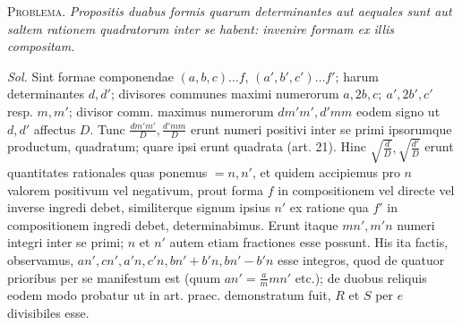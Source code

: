 \textsc{Problema.} \textit{Propositis duabus formis quarum determinantes aut aequales sunt aut saltem rationem quadratorum inter se habent: invenire formam ex illis compositam.}

\textit{Sol.} Sint formae componendae $(a,b,c)\ldots f$, $(a',b',c')\ldots f'$; harum determinantes $d,d'$; divisores communes maximi numerorum $a,2b,c;\ a',2b',c'$ resp. $m,m'$; divisor comm. maximus numerorum $dm'm',d'mm$ eodem signo ut $d,d'$
affectus $D$. Tunc $\frac{dm'm'}{D},\frac{d'mm}{D}$ erunt numeri positivi inter se primi ipsorumque productum, quadratum; quare ipsi erunt quadrata (art. 21). Hinc $\sqrt{\frac{d}{D}},\sqrt{\frac{d'}{D}}$ erunt quantitates rationales quas ponemus $=n,n'$, et quidem accipiemus pro $n$ valorem positivum vel negativum, prout forma $f$ in compositionem vel directe vel inverse ingredi debet, similiterque signum ipsius $n'$ ex ratione qua $f'$ in compositionem ingredi debet, determinabimus. Erunt itaque $mn',m'n$ numeri integri inter se primi; $n$ et $n'$ autem etiam fractiones esse possunt. His ita factis, observamus, $an',cn',a'n,c'n,bn'+b'n,bn'-b'n$ esse integros, quod de quatuor prioribus per se manifestum est (quum $an'=\frac{a}{m}mn'$ etc.); de duobus reliquis eodem modo probatur ut in art. praec. demonstratum fuit, $R$ et $S$ per $e$ divisibiles esse.

